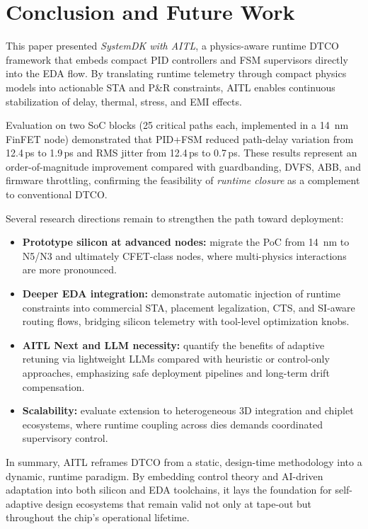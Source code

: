 \documentclass[conference]{IEEEtran}
\begin{document}
\section{Conclusion and Future Work}

This paper presented \emph{SystemDK with AITL}, a physics-aware runtime DTCO framework that embeds compact PID controllers and FSM supervisors directly into the EDA flow. By translating runtime telemetry through compact physics models into actionable STA and P\&R constraints, AITL enables continuous stabilization of delay, thermal, stress, and EMI effects. 

Evaluation on two SoC blocks (25 critical paths each, implemented in a \SI{14}{\nano\meter} FinFET node) demonstrated that PID+FSM reduced path-delay variation from 12.4\,ps to 1.9\,ps and RMS jitter from 12.4\,ps to 0.7\,ps. These results represent an order-of-magnitude improvement compared with guardbanding, DVFS, ABB, and firmware throttling, confirming the feasibility of \emph{runtime closure} as a complement to conventional DTCO.

Several research directions remain to strengthen the path toward deployment:
\begin{itemize}
  \item \textbf{Prototype silicon at advanced nodes:} migrate the PoC from \SI{14}{\nano\meter} to N5/N3 and ultimately CFET-class nodes, where multi-physics interactions are more pronounced.
  \item \textbf{Deeper EDA integration:} demonstrate automatic injection of runtime constraints into commercial STA, placement legalization, CTS, and SI-aware routing flows, bridging silicon telemetry with tool-level optimization knobs.
  \item \textbf{AITL Next and LLM necessity:} quantify the benefits of adaptive retuning via lightweight LLMs compared with heuristic or control-only approaches, emphasizing safe deployment pipelines and long-term drift compensation.
  \item \textbf{Scalability:} evaluate extension to heterogeneous 3D integration and chiplet ecosystems, where runtime coupling across dies demands coordinated supervisory control.
\end{itemize}

In summary, AITL reframes DTCO from a static, design-time methodology into a dynamic, runtime paradigm. By embedding control theory and AI-driven adaptation into both silicon and EDA toolchains, it lays the foundation for self-adaptive design ecosystems that remain valid not only at tape-out but throughout the chip’s operational lifetime.
\end{document}
